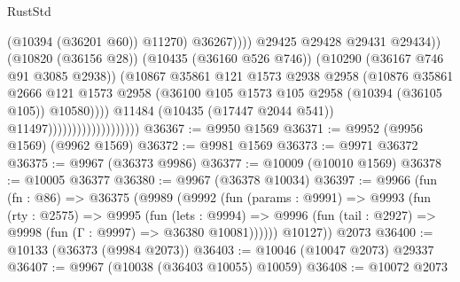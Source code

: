 \begin{lexlean}{RustStd}
\begin{coremodule}
                                                          (@10394 (@36201 @60))
                                                          @11270)
                                                        @36267))))
                                                @29425
                                                @29428
                                                @29431
                                                @29434))
                                            (@10820 (@36156 @28))
                                            (@10435 (@36160 @526 @746))
                                            (@10290 (@36167 @746 @91 @3085 @2938))
                                            (@10867
                                              @35861
                                              @121
                                              @1573
                                              @2938
                                              @2958
                                              (@10876
                                                @35861
                                                @2666
                                                @121
                                                @1573
                                                @2958
                                                (@36100
                                                  @105
                                                  @1573
                                                  @105
                                                  @2958
                                                  (@10394 (@36105 @105))
                                                  @10580))))
                                          @11484
                                          (@10435 (@17447 @2044 @541))
                                          @11497)))))))))))))))))))
@36367 := @9950 @1569
@36371 := @9952 (@9956 @1569) (@9962 @1569)
@36372 := @9981 @1569
@36373 := @9971 @36372
@36375 := @9967 (@36373 @9986)
@36377 := @10009 (@10010 @1569)
@36378 := @10005 @36377
@36380 := @9967 (@36378 @10034)
@36397 := @9966
    (fun (fn : @86) =>
    @36375
      (@9989
        (@9992
          (fun (params : @9991) =>
          @9993
            (fun (rty : @2575) =>
            @9995
              (fun (lets : @9994) =>
              @9996 (fun (tail : @2927) => @9998 (fun (Γ : @9997) => @36380 @10081))))))
        @10127))
    @2073
@36400 := @10133 (@36373 (@9984 @2073))
@36403 := @10046 (@10047 @2073) @29337
@36407 := @9967 (@10038 (@36403 @10055) @10059)
@36408 := @10072 @2073

\end{coremodule}
\end{lexlean}
